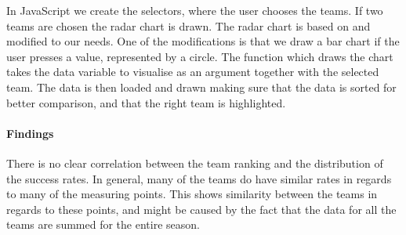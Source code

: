 \documentclass[Report.tex]{subfiles}
\begin{document}
In JavaScript we create the selectors, where the user chooses the teams. If two teams are chosen the radar chart is drawn. The radar chart is based on \cite{Radar} and modified to our needs. One of the modifications is that we draw a bar chart if the user presses a value, represented by a circle. The function which draws the chart takes the data variable to visualise as an argument together with the selected team. The data is then loaded and drawn making sure that the data is sorted for better comparison, and that the right team is highlighted.
\paragraph{Findings\\}
There is no clear correlation between the team ranking and the distribution of the success rates. In general, many of the teams do have similar rates in regards to many of the measuring points. This shows similarity between the teams in regards to these points, and might be caused by the fact that the data for all the teams are summed for the entire season.
\end{document}
